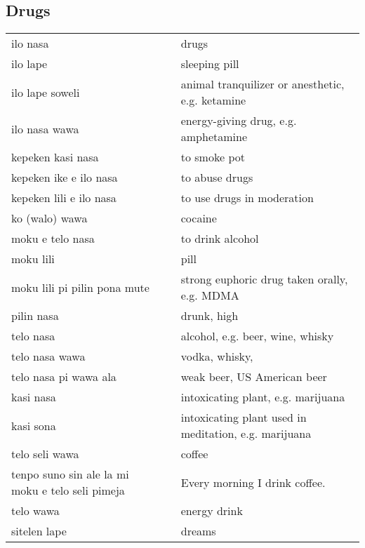 \subsection{Drugs}
%
\begin{supertabular}{p{4,5cm}|ll}
ilo nasa && drugs \\
ilo lape && sleeping pill \\
ilo lape soweli && animal tranquilizer or anesthetic, e.g. ketamine \\
ilo nasa wawa && energy-giving drug, e.g. amphetamine \\
kepeken kasi nasa && to smoke pot \\
kepeken ike e ilo nasa && to abuse drugs \\ 
kepeken lili e ilo nasa && to use drugs in moderation \\
ko (walo) wawa && cocaine \\
moku e telo nasa && to drink alcohol \\
moku lili && pill \\
moku lili pi pilin pona mute && strong euphoric drug taken orally, e.g. MDMA \\
pilin nasa && drunk, high \\
telo nasa && alcohol, e.g. beer, wine, whisky \\
telo nasa wawa && vodka, whisky, \\
telo nasa pi wawa ala && weak beer, US American beer \\
kasi nasa && intoxicating plant, e.g. marijuana \\
kasi sona && intoxicating plant used in meditation, e.g. marijuana \\
telo seli wawa && coffee \\ 
tenpo suno sin ale la mi moku e telo seli pimeja && Every morning I drink coffee. \\
telo wawa && energy drink \\ 
sitelen lape && dreams \\
\end{supertabular} \\
%
%
